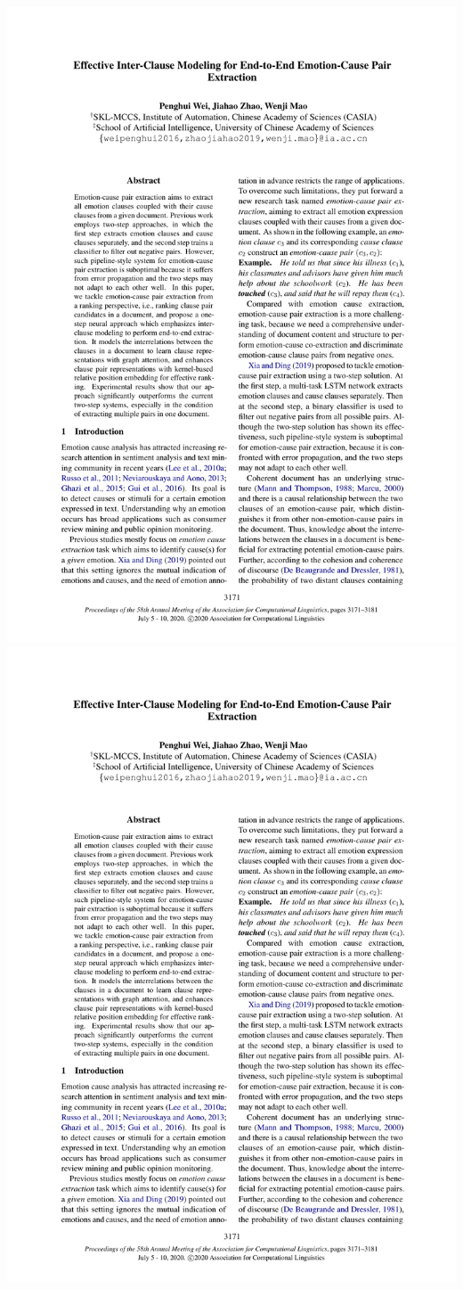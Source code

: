 {\includegraphics[width=\textwidth, page=8, trim = 15mm 20mm 15mm 20mm]{pdfs/ranking.pdf}
\includegraphics[width=\textwidth, page=9, trim = 15mm 20mm 15mm 20mm]{pdfs/ranking.pdf}
}
